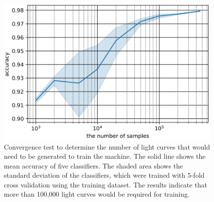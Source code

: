 \documentclass[useamsfonts]{pasj01}
\begin{document}
%
%
\begin{figure}[htbp]
  \begin{center}
     \includegraphics[width=\columnwidth]{figures/size_accuracy.eps}
  \end{center}
  \caption{%
Convergence test to determine the number of light curves that would need to be generated to train the machine. 
The solid line shows the mean accuracy of five classifiers. The shaded area shows the standard deviation of the classifiers, which were trained with 5-fold cross validation using the training dataset. 
The results indicate that more than 100,000 light curves would be required for training.
  }%
  \label{fig:size_convergence_test}
\end{figure}
%

%
\end{document}
